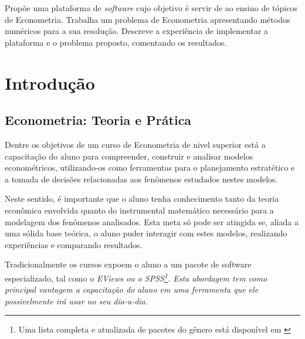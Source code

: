 \documentclass{abnt}
\begin{document}
\folhaderosto
\addtocounter{page}{1}

\vspace{4cm}
Propõe uma plataforma de \textit{software} cujo objetivo é servir de ao ensino de tópicos de Econometria. Trabalha um problema de Econometria apresentando métodos numéricos para a sua resolução. Descreve a experiência de implementar a plataforma e o problema proposto, comentando os resultados.


\newpage




\sumario

\chapter{Introdução}

\section{Econometria: Teoria e Prática}

Dentre os objetivos de um curso de Econometria de nivel superior está a capacitação do aluno para compreender, construir e analisar modelos econométricos, utilizando-os como ferramentas para o planejamento estratético e a tomada de decisões relacionadas aos fenômenos estudados nestes modelos.

Neste sentido, é importante que o aluno tenha conhecimento tanto da teoria econômica envolvida quanto do instrumental matemático necessário para a modelagem dos fenômenos analisados. Esta meta só pode ser atingida se, aliada a uma sólida base teórica, o aluno puder interagir com estes modelos, realizando experiências e comparando resultados.

Tradicionalmente os cursos expoem o aluno a um pacote de software especializado, tal como o \em{EViews} ou o \em{SPSS}\footnote{Uma lista completa e atualizada de pacotes do gênero está disponível em \cite{web:econsoftware}}. Esta abordagem tem como principal vantagem a capacitação do aluno em uma ferramenta que ele possivelmente irá usar no seu dia-a-dia. 
\end{document}
